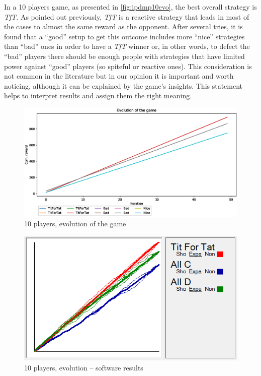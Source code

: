 \documentclass[journal,10pt,twoside]{IEEEtran}
\begin{document}
In a 10 players game, as presented in \autoref{fig:ipdmp10evo}, the best overall strategy is \textit{TfT}. As pointed out previously, \textit{TfT} is a reactive strategy that leads in most of the cases to almost the same reward as the opponent. After several tries, it is found that a ``good'' setup to get this outcome includes more ``nice'' strategies than ``bad'' ones in order to have a \textit{TfT} winner or, in other words, to defect the ``bad'' players there should be enough people with strategies that have limited power against ``good'' players (so spiteful or reactive ones). This consideration is not common in the literature but in our opinion it is important and worth noticing, although it can be explained by the game's insights. This statement helps to interpret results and assign them the right meaning.

\begin{figure}[!ht]
    \centering
	\includegraphics[width=1\columnwidth]{../img/ipdmp/ipdmp-evolution-of-game-10}
	\caption{10 players, evolution of the game}
	\label{fig:ipdmp10evo}
\end{figure}

\begin{figure}[!ht]
    \centering
	\includegraphics[width=.8\columnwidth]{../img/ipdmp/ipdmp10-plot-det}
	\caption{10 players, evolution -- software results \cite{demosw}}
	\label{fig:ipdmp10evosw}
\end{figure}
\end{document}
